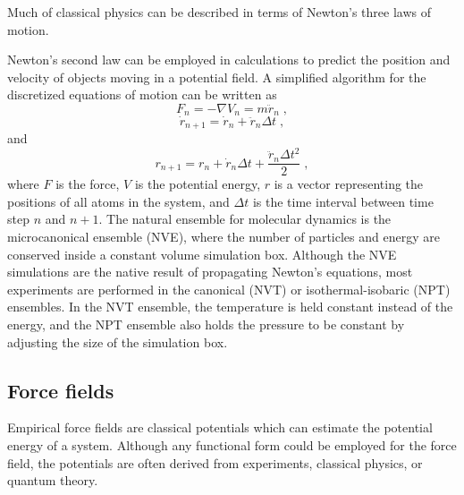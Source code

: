 \documentclass[12pt]{report}
\begin{document}
Much of classical physics can be described in terms of Newton's three laws of
motion.
\begin{quote}
\end{quote}
Newton's second law can be employed in calculations to predict the position
and velocity of objects moving in a potential field. A simplified algorithm
for the discretized equations of motion can be written as
\begin{equation}
 F_{n} = -\nabla V_{n} = m\ddot r_{n} \; ,
\end{equation}
\begin{equation}
 \dot r_{n+1} = \dot r_{n}+\ddot r_{n}\Delta t \; ,
\end{equation}
and
\begin{equation}
 r_{n+1} = r_{n}+\dot r_{n}\Delta t+\frac{\ddot r_{n}\Delta t^2}{2} \; ,
\end{equation}
where $F$ is the force, $V$ is the potential energy, $r$ is a vector
representing the positions of all atoms in the system, and $\Delta t$ is the
time interval between time step $n$ and $n+1$. The natural ensemble for
molecular dynamics is the microcanonical ensemble (NVE), where the number of
particles and energy are conserved inside a constant volume simulation box.
Although the NVE simulations are the native result of propagating Newton's
equations, most experiments are performed in the canonical (NVT) or
isothermal-isobaric (NPT) ensembles. In the NVT ensemble, the temperature is
held constant instead of the energy, and the NPT ensemble also holds the
pressure to be constant by adjusting the size of the simulation box.

\subsection{Force fields}

Empirical force fields are classical potentials which can estimate the
potential energy of a system. Although any functional form could be employed
for the force field, the potentials are often derived from experiments,
classical physics, or quantum theory. \\
\end{document}
